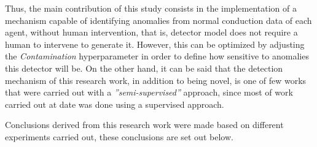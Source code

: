Thus, the main contribution of this study consists in the implementation of a mechanism capable of identifying anomalies from normal conduction data of each agent, without human intervention, that is, detector model does not require a human to intervene to generate it. However, this can be optimized by adjusting the \textit{Contamination} hyperparameter in order to define how sensitive to anomalies this detector will be. On the other hand, it can be said that the detection mechanism of this research work, in addition to being novel, is one of few works that were carried out with a \textit{''semi-supervised''} approach, since most of work carried out at date was done using a supervised approach.

\vspace{5mm} %

Conclusions derived from this research work were made based on different experiments carried out, these conclusions are set out below.

